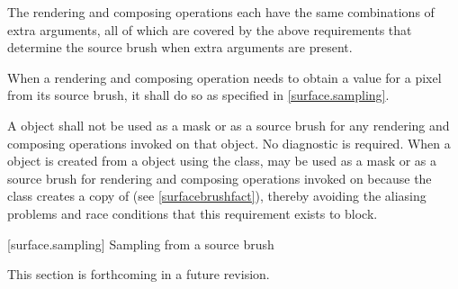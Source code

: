 \pnum
\enternote
The rendering and composing operations each have the same combinations of extra arguments, all of which are covered by the above requirements that determine the source brush when extra arguments are present.
\exitnote

\pnum
When a rendering and composing operation needs to obtain a value for a pixel from its source brush, it shall do so as specified in \ref{surface.sampling}. %

\pnum
A  object shall not be used as a mask or as a source brush for any rendering and composing operations invoked on that  object. No diagnostic is required.
\enternote
When a  object  is created from a  object  using the  class,  may be used as a mask or as a source brush for rendering and composing operations invoked on  because the  class creates a copy of  (see \ref{surfacebrushfact}), thereby avoiding the aliasing problems and race conditions that this requirement exists to block.
\exitnote

 [surface.sampling] {Sampling from a source brush}

\pnum
This section is forthcoming in a future revision.

